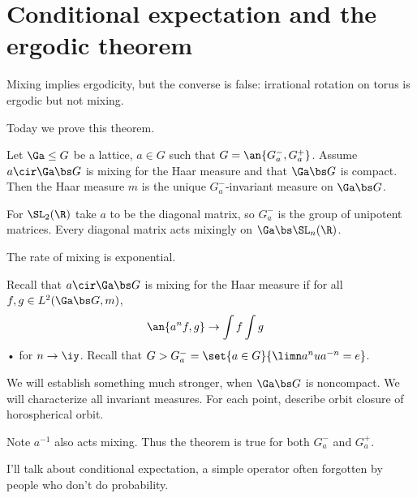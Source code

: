 
\section{Conditional expectation and the ergodic theorem}
Mixing implies ergodicity, but the converse is false: irrational rotation on torus is ergodic but not mixing.

Today we prove this theorem.
\begin{thm}\label{thm:mix-hor}
Let $\Ga\le G$ be a lattice, $a\in G$ such that $G=\an{G_a^-,G_a^+}$. Assume $a\cir \Ga \bs G$ is mixing for the Haar measure and that $\Ga \bs G$ is compact. Then the Haar measure $m$ is the unique $G_a^-$-invariant measure on $\Ga\bs G$.
\end{thm}
For $\SL_2(\R)$ take $a$ to be the diagonal matrix, so $G_a^-$ is the group of unipotent matrices. Every diagonal matrix acts mixingly on $\Ga\bs \SL_n(\R)$.  

The rate of mixing is exponential.

Recall that $a\cir \Ga \bs G$ is mixing for the Haar measure if for all $f,g\in L^2(\Ga \bs G, m)$, 
\begin{align}
\an{a^n f,g} &\to \int f \int g
\end{align}•
for $n\to \iy$. Recall that $G>G_a^- = \set{a\in G}{\limn a^n ua^{-n}=e}$.

We will establish something much stronger, when $\Ga\bs G$ is noncompact. We will characterize all invariant measures. For each point, describe orbit closure of horospherical orbit. 

Note $a^{-1}$ also acts mixing. Thus the theorem is true for both $G_a^-$ and $G_a^+$.

I'll talk about conditional expectation, a simple operator often forgotten by people who don't do probability.



